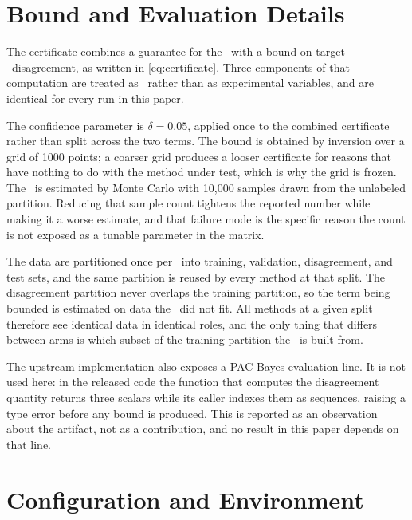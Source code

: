 \appendix

\section{Bound and Evaluation Details}
\label{sec:appendix-bound}

The certificate combines a guarantee for the \surrogate\ with a bound on
target-\surrogate\ disagreement, as written in \cref{eq:certificate}. Three
components of that computation are treated as \evalsem\ rather than
as experimental variables, and are identical for every run in this paper.

The confidence parameter is $\delta = 0.05$, applied once to the combined
certificate rather than split across the two terms. The bound is obtained by
inversion over a grid of 1000 points; a coarser grid produces a looser
certificate for reasons that have nothing to do with the method under test,
which is why the grid is frozen. The \disagreement\ is estimated by Monte
Carlo with 10{,}000 samples drawn from the unlabeled partition. Reducing that
sample count tightens the reported number while making it a worse estimate, and
that failure mode is the specific reason the count is not exposed as a tunable
parameter in the matrix.

The data are partitioned once per \splitseed\ into training, validation,
disagreement, and test sets, and the same partition is reused by every method at
that split. The disagreement partition never overlaps the training partition,
so the term being bounded is estimated on data the \surrogate\ did not fit. All
methods at a given split therefore see identical data in identical roles, and
the only thing that differs between arms is which subset of the training
partition the \surrogate\ is built from.

The upstream implementation also exposes a PAC-Bayes evaluation line. It is not
used here: in the released code the function that computes the disagreement
quantity returns three scalars while its caller indexes them as sequences,
raising a type error before any bound is produced. This is reported as an
observation about the artifact, not as a contribution, and no result in this
paper depends on that line.

\section{Configuration and Environment}
\label{sec:appendix-config}

